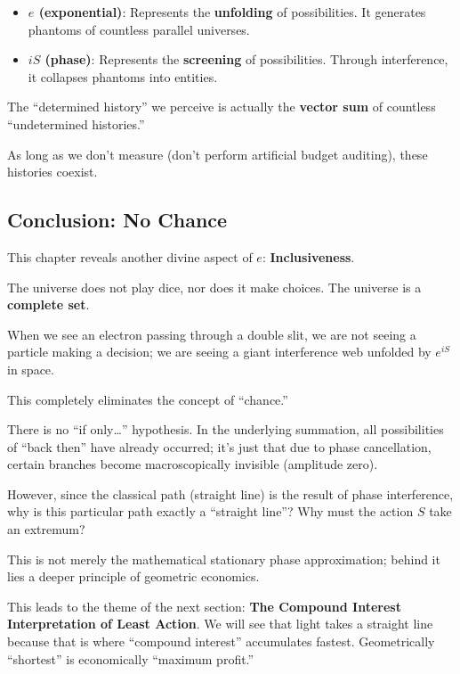 \documentclass[11pt,a4paper,twoside]{book}
\begin{document}
\begin{itemize}
\item \textbf{$e$ (exponential)}: Represents the \textbf{unfolding} of possibilities. It generates phantoms of countless parallel universes.

\item \textbf{$iS$ (phase)}: Represents the \textbf{screening} of possibilities. Through interference, it collapses phantoms into entities.
\end{itemize}

The ``determined history'' we perceive is actually the \textbf{vector sum} of countless ``undetermined histories.''

As long as we don't measure (don't perform artificial budget auditing), these histories coexist.

\subsection{Conclusion: No Chance}

This chapter reveals another divine aspect of $e$: \textbf{Inclusiveness}.

The universe does not play dice, nor does it make choices. The universe is a \textbf{complete set}.

When we see an electron passing through a double slit, we are not seeing a particle making a decision; we are seeing a giant interference web unfolded by $e^{iS}$ in space.

This completely eliminates the concept of ``chance.''

There is no ``if only\ldots'' hypothesis. In the underlying summation, all possibilities of ``back then'' have already occurred; it's just that due to phase cancellation, certain branches become macroscopically invisible (amplitude zero).

However, since the classical path (straight line) is the result of phase interference, why is this particular path exactly a ``straight line''? Why must the action $S$ take an extremum?

This is not merely the mathematical stationary phase approximation; behind it lies a deeper principle of geometric economics.

This leads to the theme of the next section: \textbf{The Compound Interest Interpretation of Least Action}. We will see that light takes a straight line because that is where ``compound interest'' accumulates fastest. Geometrically ``shortest'' is economically ``maximum profit.''
\end{document}

